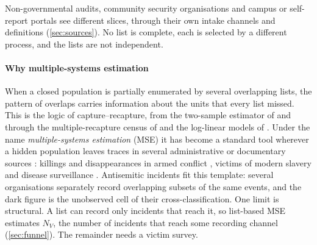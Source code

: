 Non-governmental audits, community security organisations and campus or
self-report portals see different slices, through their own intake channels
and definitions (\cref{sec:sources}). No list is complete, each is selected
by a different process, and the lists are not independent.

\paragraph{Why multiple-systems estimation}
When a closed population is partially enumerated by several overlapping
lists, the pattern of overlaps carries information about the units that every
list missed. This is the logic of capture--recapture, from the two-sample
estimator of \citet{petersen1896} and \citet{lincoln1930} through the
multiple-recapture census of \citet{darroch1958} and the log-linear models of
\citet{fienberg1972}. Under the name \emph{multiple-systems estimation} (MSE)
it has become a standard tool wherever a hidden population leaves traces in
several administrative or documentary sources \citep{bird2018}: killings and
disappearances in armed conflict \citep{lum2013,ball2018,sadinle2018}, victims
of modern slavery \citep{silverman2020} and disease surveillance
\citep{international1995,chao2001}. Antisemitic incidents fit this template:
several organisations separately record overlapping subsets of the same
events, and the dark figure is the unobserved cell of their
cross-classification. One limit is structural. A list can record only
incidents that reach it, so list-based MSE estimates $N_V$, the number of
incidents that reach some recording channel (\cref{sec:funnel}). The
remainder needs a victim survey.

